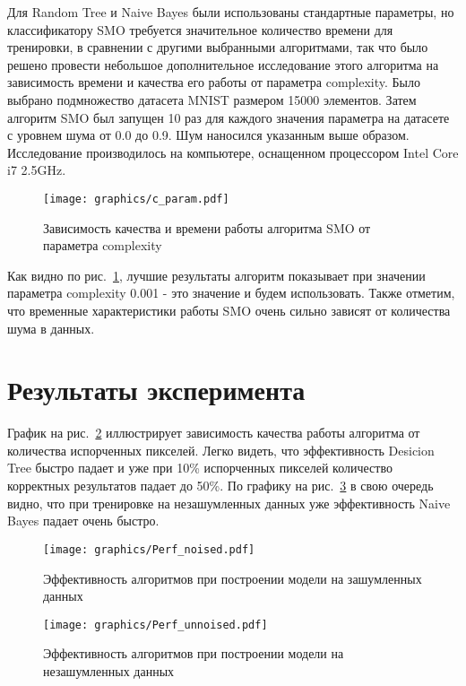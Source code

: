 \documentclass{article}
\begin{document}
Для Random Tree и Naive Bayes были использованы стандартные параметры, но классификатору SMO требуется значительное количество времени для тренировки, в сравнении с другими выбранными алгоритмами, так что было решено провести небольшое дополнительное исследование этого алгоритма на зависимость времени и качества его работы от параметра complexity. Было выбрано подмножество датасета MNIST размером 15000 элементов. Затем алгоритм SMO был запущен 10 раз для каждого значения параметра на датасете с уровнем шума от 0.0 до 0.9. Шум наносился указанным выше образом. Исследование производилось на компьютере, оснащенном процессором Intel Core i7 2.5GHz.
\begin{figure}[ht!]
\texttt{[image: graphics/c\_param.pdf]}
\captionsetup{justification=centering}
\caption{Зависимость качества и времени работы алгоритма SMO от параметра complexity}
\label{fig:SMO_qual}
\end{figure}
Как видно по рис.~\ref{fig:SMO_qual}, лучшие результаты алгоритм показывает при значении параметра complexity 0.001 - это значение и будем использовать. Также отметим, что временные характеристики работы SMO очень сильно зависят от количества шума в данных.


\newpage
\section{Результаты эксперимента}
График на рис.~\ref{fig:perf1} иллюстрирует зависимость качества работы алгоритма от количества испорченных пикселей. Легко видеть, что эффективность Desicion Tree быстро падает и уже при 10\% испорченных пикселей количество корректных результатов падает до 50\%.
По графику на рис.~\ref{fig:perf2} в свою очередь видно, что при тренировке на незашумленных данных уже эффективность Naive Bayes падает очень быстро.
\newpage
\begin{figure}[ht!]
\texttt{[image: graphics/Perf\_noised.pdf]}
\captionsetup{justification=centering}
\caption{Эффективность алгоритмов при построении модели на зашумленных данных}
\label{fig:perf1}
\end{figure}


\begin{figure}[ht!]
\texttt{[image: graphics/Perf\_unnoised.pdf]}
\captionsetup{justification=centering}
\caption{Эффективность алгоритмов при построении модели на незашумленных данных}
\label{fig:perf2}
\end{figure}
\clearpage
\end{document}
